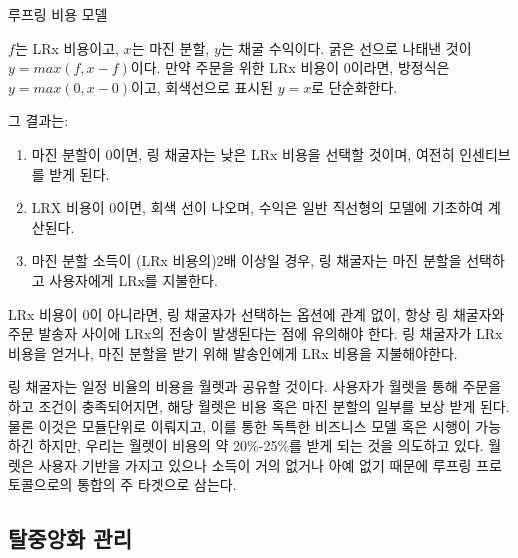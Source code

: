 \documentclass{article}
\makeatletter
\newenvironment{figurehere}
{\def\@captype{figure}}
{}
\makeatother
\begin{document}
\begin{multicols}{2}
\begin{center}
\begin{figurehere}
\caption{루프링 비용 모델}
\label{fig:feemodel}
\end{figurehere}
\end{center}
		
$f$는 LRx 비용이고, $x$는 마진 분할, $y$는 채굴 수익이다. 굵은 선으로 나태낸 것이 $y=max(f, x-f)$이다. 만약 주문을 위한 LRx 비용이 $0$이라면, 방정식은 $y=max(0, x - 0)$이고, 회색선으로 표시된 $y = x$로 단순화한다.

그 결과는:

\begin{enumerate}
      \item 마진 분할이 0이면, 링 채굴자는 낮은 LRx 비용을 선택할 것이며, 여전히 인센티브를 받게 된다.
      \item LRX 비용이 0이면, 회색 선이 나오며, 수익은 일반 직선형의 모델에 기초하여 계산된다.
      \item 마진 분할 소득이 (LRx 비용의)2배 이상일 경우, 링 채굴자는 마진 분할을 선택하고 사용자에게 LRx를 지불한다.
\end{enumerate}

LRx 비용이 0이 아니라면, 링 채굴자가 선택하는 옵션에 관계 없이, 항상 링 채굴자와 주문 발송자 사이에 LRx의 전송이 발생된다는 점에 유의해야 한다. 링 채굴자가 LRx 비용을 얻거나, 마진 분할을 받기 위해 발송인에게 LRx 비용을 지불해야한다. 

링 채굴자는 일정 비율의 비용을 월렛과 공유할 것이다. 사용자가 월렛을 통해 주문을 하고 조건이 충족되어지면, 해당 월렛은 비용 혹은 마진 분할의 일부를 보상 받게 된다. 물론 이것은 모듈단위로 이뤄지고, 이를 통한 독특한 비즈니스 모델 혹은 시행이 가능하긴 하지만, 우리는 월렛이 비용의 약 20\%-25\%를 받게 되는 것을 의도하고 있다. 월렛은 사용자 기반을 가지고 있으나 소득이 거의 없거나 아예 없기 때문에 루프링 프로토콜으로의 통합의 주 타겟으로 삼는다.

\subsection{탈중앙화 관리}


\end{multicols}
\end{document}
